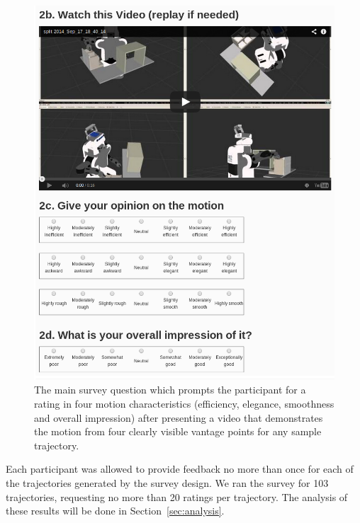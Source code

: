 \documentclass[letterpaper, 10 pt, conference]{ieeeconf}  %
\begin{document}
\begin{figure}
    \includegraphics[trim = 0mm 0mm 0mm 0mm, width=\columnwidth]{pictures/amazon_survey_screenshot}
    \caption{The main survey question which prompts the participant for a rating in four motion characteristics (efficiency, elegance, smoothness and overall impression) after presenting a video that demonstrates the motion from four clearly visible vantage points for any sample trajectory.}
    \label{fig:survey_question}
\end{figure}

Each participant was allowed to provide feedback no more than once for each of the trajectories generated by the survey design. We ran the survey for 103 trajectories, requesting no more than 20 ratings per trajectory. The analysis of these results will be done in Section~\ref{sec:analysis}.
\end{document}
